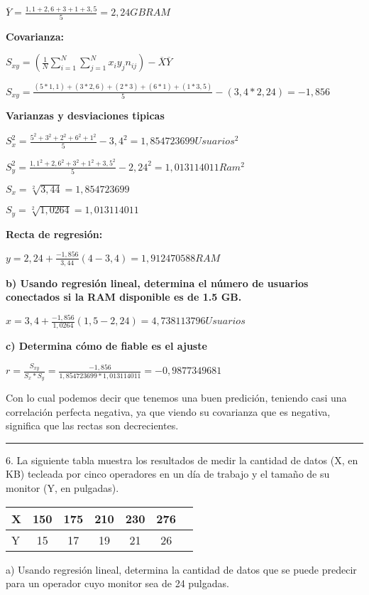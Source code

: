 \documentclass{article}
\begin{document}
\(\overline{Y} = \frac{1,1 + 2,6 +3 + 1 + 3,5}{5} = 2,24 GB RAM\)

\textbf{Covarianza:}


\(S_{xy} = (\frac{1}{N} \displaystyle\sum_{i=1}^{N} \displaystyle\sum_{j=1}^{N} x_{i} y_{j} n_{ij}) - \overline{X} \overline{Y}\)

\(S_{xy} = \frac{(5 * 1,1) + (3 * 2,6) + (2 * 3) + (6 * 1) + (1 * 3,5)}{5} - (3,4 * 2,24) = -1,856\)

\textbf{Varianzas y desviaciones tipicas}

\(S_{x}^2 = \frac{5^{2} + 3^{2} + 2^{2} + 6^{2} + 1^{2}}{5} - 3,4^{2} = 1,854723699 Usuarios^{2}\)

\(S_{y}^2 = \frac{1,1^{2} + 2,6^{2} + 3^{2} + 1^{2} + 3,5^{2}}{5} - 2,24^{2} = 1,013114011 Ram^{2}\)

\(S_{x} = \sqrt[2]{3,44} = 1,854723699\)

\(S_{y} = \sqrt[2]{1,0264} = 1,013114011\)

\textbf{Recta de regresi\'on:}

\(y = 2,24 + \frac{-1,856}{3,44}(4 - 3,4) = 1,912470588 RAM\)

\textbf{b) Usando regresi\'on lineal, determina el n\'umero de usuarios conectados si la RAM disponible es de 1.5 GB.}

\(x = 3,4 + \frac{-1,856}{1,0264}(1,5 - 2,24) = 4,738113796 Usuarios\)


\textbf{c) Determina c\'omo de fiable es el ajuste}

\(r = \frac{S_{xy}}{S_{x} * S_{y}} = \frac{-1,856}{1,854723699 * 1,013114011} = -0,9877349681\)

Con lo cual podemos decir que tenemos una buen predici\'on, teniendo  casi una correlaci\'on perfecta negativa, ya que viendo su covarianza que es negativa, significa que las rectas son decrecientes.

\rule{119mm}{0.5mm}

6. La siguiente tabla muestra los resultados de medir la cantidad de datos (X, en KB) tecleada por cinco operadores en un día de trabajo y el tamaño de su monitor (Y, en pulgadas).

\begin{tabular}{|l|c|c|c|c|c|c|}
X & 150 & 175 & 210 & 230 & 276\\
\hline
Y  & 15 & 17 & 19 & 21 & 26\\
\end{tabular}

a) Usando regresi\'on lineal, determina la cantidad de datos que se puede predecir para un operador cuyo monitor sea de 24 pulgadas.
\end{document}
